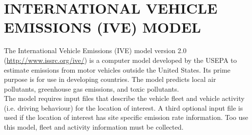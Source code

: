 \chapter{INTERNATIONAL VEHICLE EMISSIONS (IVE) MODEL}

The International Vehicle Emissions (IVE) model version 2.0 (\url{http://www.issrc.org/ive/}) is a computer model developed by the USEPA to estimate emissions from motor vehicles outside the United States. Its prime purpose is for use in developing countries.  The model predicts local air pollutants, greenhouse gas emissions, and toxic pollutants.\\

The model requires input files that describe the vehicle fleet and vehicle activity (i.e. driving behaviour) for the location of interest.  A third optional input file is used if the location of interest has site specific emission rate information.  Too use this model,  fleet and activity information must be collected. 
